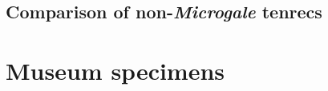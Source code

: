 \documentclass[12pt,a4paper]{article}
\begin{document}
\subsection{Comparison of non-\textit{Microgale} tenrecs}


\section{Museum specimens}




\end{document}
